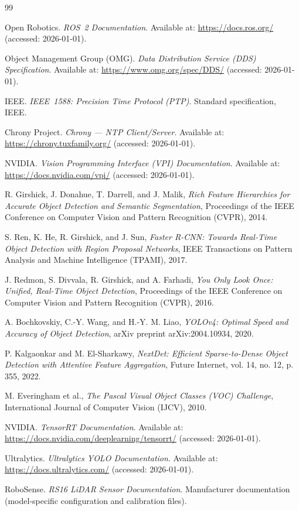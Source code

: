 \documentclass[12pt,a4paper]{report}
\begin{document}
\renewcommand{\bibname}{References}
\begin{thebibliography}{99}

Open Robotics. \emph{ROS~2 Documentation}. Available at: \url{https://docs.ros.org/} (accessed: 2026-01-01).

Object Management Group (OMG). \emph{Data Distribution Service (DDS) Specification}. Available at: \url{https://www.omg.org/spec/DDS/} (accessed: 2026-01-01).

IEEE. \emph{IEEE~1588: Precision Time Protocol (PTP)}. Standard specification, IEEE.

Chrony Project. \emph{Chrony --- NTP Client/Server}. Available at: \url{https://chrony.tuxfamily.org/} (accessed: 2026-01-01).

NVIDIA. \emph{Vision Programming Interface (VPI) Documentation}. Available at: \url{https://docs.nvidia.com/vpi/} (accessed: 2026-01-01).

R. Girshick, J. Donahue, T. Darrell, and J. Malik,
\textit{Rich Feature Hierarchies for Accurate Object Detection and Semantic Segmentation},
Proceedings of the IEEE Conference on Computer Vision and Pattern Recognition (CVPR),
2014.

S. Ren, K. He, R. Girshick, and J. Sun,
\textit{Faster R-CNN: Towards Real-Time Object Detection with Region Proposal Networks},
IEEE Transactions on Pattern Analysis and Machine Intelligence (TPAMI),
2017.


J. Redmon, S. Divvala, R. Girshick, and A. Farhadi,
\textit{You Only Look Once: Unified, Real-Time Object Detection},
Proceedings of the IEEE Conference on Computer Vision and Pattern Recognition (CVPR),
2016.

A. Bochkovskiy, C.-Y. Wang, and H.-Y. M. Liao,
\textit{YOLOv4: Optimal Speed and Accuracy of Object Detection},
arXiv preprint arXiv:2004.10934,
2020.

P. Kalgaonkar and M. El-Sharkawy,  
\textit{NextDet: Efficient Sparse-to-Dense Object Detection with Attentive Feature Aggregation},  
Future Internet, vol. 14, no. 12, p. 355, 2022.

M. Everingham et al.,
\textit{The Pascal Visual Object Classes (VOC) Challenge},
International Journal of Computer Vision (IJCV),
2010.

NVIDIA. \emph{TensorRT Documentation}. Available at: \url{https://docs.nvidia.com/deeplearning/tensorrt/} (accessed: 2026-01-01).

Ultralytics. \emph{Ultralytics YOLO Documentation}. Available at: \url{https://docs.ultralytics.com/} (accessed: 2026-01-01).

RoboSense. \emph{RS16 LiDAR Sensor Documentation}. Manufacturer documentation (model-specific configuration and calibration files).

\end{thebibliography}
\end{document}
